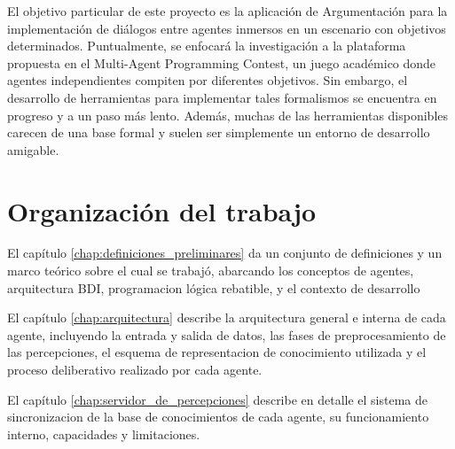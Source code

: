  El objetivo particular de este proyecto es la aplicación de
 Argumentación para la implementación de diálogos entre agentes
 inmersos en un escenario con objetivos determinados.
 Puntualmente, se enfocará la investigación a la plataforma propuesta
 en el Multi-Agent Programming Contest, un juego académico donde
 agentes independientes compiten por diferentes objetivos.
 Sin embargo, el desarrollo de herramientas para implementar tales
 formalismos se encuentra en progreso y a un paso más lento.
 Además, muchas de las herramientas disponibles carecen de una base
 formal y suelen ser simplemente un entorno de desarrollo amigable.

\section{Organización del trabajo}
\label{sec:organizacion_del_trabajo}
 
 El capítulo \ref{chap:definiciones_preliminares} da un conjunto de
 definiciones y un marco teórico sobre el cual se trabajó, abarcando
 los conceptos de agentes, arquitectura BDI, programacion lógica
 rebatible, y el contexto de desarrollo
 
 El capítulo \ref{chap:arquitectura} describe la arquitectura general e
 interna de cada agente, incluyendo la entrada y salida de datos, las
 fases de preprocesamiento de las percepciones, el esquema de
 representacion de conocimiento utilizada y el proceso deliberativo
 realizado por cada agente.
 
 El capítulo \ref{chap:servidor_de_percepciones} describe en detalle el
 sistema de sincronizacion de la base de conocimientos de cada agente,
 su funcionamiento interno, capacidades y limitaciones.
 